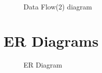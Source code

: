 \documentclass[oneside,a4paper,12pt]{report}
\begin{document}
\begin{center}
	\begin{figure}[!htbp]
		\centering
	  \caption{Data Flow(2) diagram}
	  \label{fig:act-dig}
	\end{figure}
\end{center}  
\newpage

\section{ER Diagrams}
 \begin{center}
	\begin{figure}[!htbp]
		\centering
	  \caption{ER Diagram}
	  \label{fig:class-dig}
	\end{figure}
\end{center} 
\end{document}
